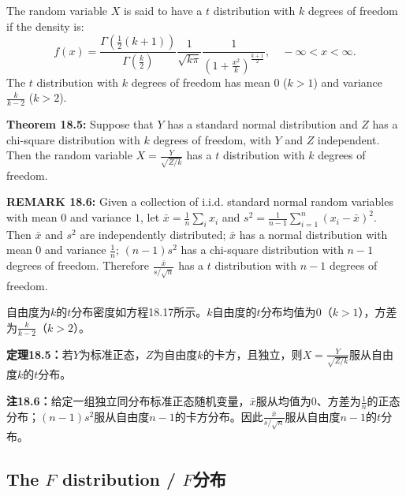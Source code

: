 \begin{original}
The random variable $X$ is said to have a $t$ distribution with $k$ degrees of freedom if the density is:
\[
f(x) = \frac{\Gamma(\frac{1}{2}(k+1))}{\Gamma(\frac{k}{2})} \frac{1}{\sqrt{k\pi}} \frac{1}{(1 + \frac{x^2}{k})^{\frac{k+1}{2}}}, \quad -\infty < x < \infty. \tag{18.17}
\]
The $t$ distribution with $k$ degrees of freedom has mean $0$ ($k > 1$) and variance $\frac{k}{k-2}$ ($k > 2$).

\textbf{Theorem 18.5:} Suppose that $Y$ has a standard normal distribution and $Z$ has a chi-square distribution with $k$ degrees of freedom, with $Y$ and $Z$ independent. Then the random variable $X = \frac{Y}{\sqrt{Z/k}}$ has a $t$ distribution with $k$ degrees of freedom.

\textbf{REMARK 18.6:} Given a collection of i.i.d. standard normal random variables with mean $0$ and variance $1$, let $\bar{x} = \frac{1}{n}\sum_i x_i$ and $s^2 = \frac{1}{n-1}\sum_{i=1}^{n} (x_i - \bar{x})^2$. Then $\bar{x}$ and $s^2$ are independently distributed; $\bar{x}$ has a normal distribution with mean $0$ and variance $\frac{1}{n}$; $(n-1)s^2$ has a chi-square distribution with $n-1$ degrees of freedom. Therefore $\frac{\bar{x}}{s/\sqrt{n}}$ has a $t$ distribution with $n-1$ degrees of freedom.
\end{original}
\begin{translation}
自由度为$k$的$t$分布密度如方程18.17所示。$k$自由度的$t$分布均值为$0$（$k > 1$），方差为$\frac{k}{k-2}$（$k > 2$）。

\textbf{定理18.5：}若$Y$为标准正态，$Z$为自由度$k$的卡方，且独立，则$X = \frac{Y}{\sqrt{Z/k}}$服从自由度$k$的$t$分布。

\textbf{注18.6：}给定一组独立同分布标准正态随机变量，$\bar{x}$服从均值为$0$、方差为$\frac{1}{n}$的正态分布；$(n-1)s^2$服从自由度$n-1$的卡方分布。因此$\frac{\bar{x}}{s/\sqrt{n}}$服从自由度$n-1$的$t$分布。
\end{translation}

\subsection{The $F$ distribution / $F$分布}

